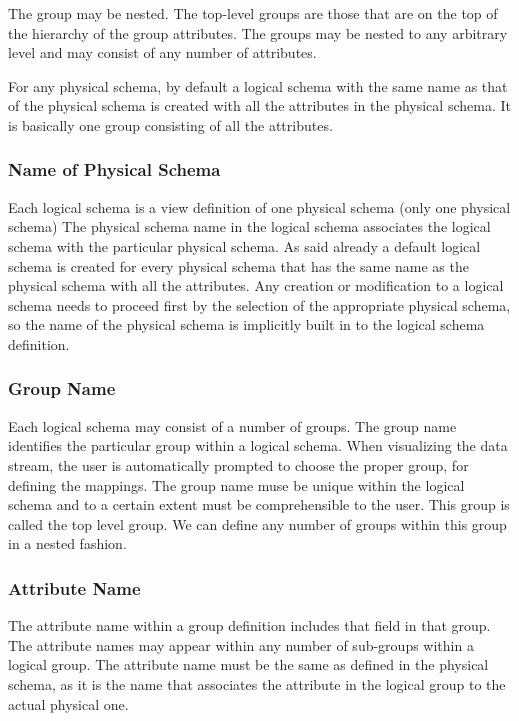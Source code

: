 The group may be nested. The top-level groups are those that are on
the top of the hierarchy of the group attributes. The groups may be
nested to any arbitrary level and may consist of any number of
attributes.

For any physical schema, by default a logical schema with the same
name as that of the physical schema is created with all the attributes
in the physical schema. It is basically one group consisting of all
the attributes.


\subsubsection{Name of Physical Schema}

Each logical schema is a view definition of one physical schema (only
one physical schema) The physical schema name in the logical schema
associates the logical schema with the particular physical schema. As
said already a default logical schema is created for every physical
schema that has the same name as the physical schema with all the
attributes. Any creation or modification to a logical schema needs to
proceed first by the selection of the appropriate physical schema, so
the name of the physical schema is implicitly built in to the logical
schema definition.

\subsubsection{Group Name}

Each logical schema may consist of a number of groups. The group name
identifies the particular group within a logical schema. When
visualizing the data stream, the user is automatically prompted to
choose the proper group, for defining the mappings. The group name
muse be unique within the logical schema and to a certain extent must
be comprehensible to the user. This group is called the top level
group. We can define any number of groups within this group in a
nested fashion.

\subsubsection{Attribute Name}

The attribute name within a group definition includes that field in
that group. The attribute names may appear within any number of
sub-groups within a logical group. The attribute name must be the same
as defined in the physical schema, as it is the name that associates
the attribute in the logical group to the actual physical one.


